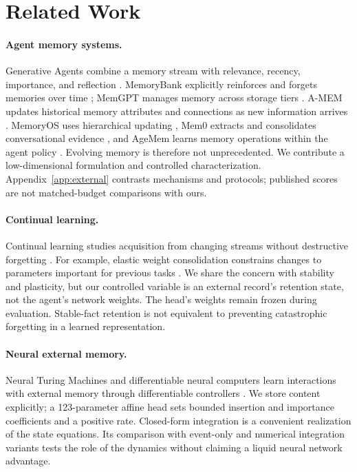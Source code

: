 \section{Related Work}
\paragraph{Agent memory systems.}
Generative Agents combine a memory stream with relevance, recency, importance, and reflection \citep{generative}. MemoryBank explicitly reinforces and forgets memories over time \citep{memorybank}; MemGPT manages memory across storage tiers \citep{memgpt}. A-MEM updates historical memory attributes and connections as new information arrives \citep{amem}. MemoryOS uses hierarchical updating \citep{memoryos}, Mem0 extracts and consolidates conversational evidence \citep{mem0}, and AgeMem learns memory operations within the agent policy \citep{agemem}. Evolving memory is therefore not unprecedented. We contribute a low-dimensional formulation and controlled characterization. Appendix~\ref{app:external} contrasts mechanisms and protocols; published scores are not matched-budget comparisons with ours.

\paragraph{Continual learning.}
Continual learning studies acquisition from changing streams without destructive forgetting \citep{continual}. For example, elastic weight consolidation constrains changes to parameters important for previous tasks \citep{ewc}. We share the concern with stability and plasticity, but our controlled variable is an external record's retention state, not the agent's network weights. The head's weights remain frozen during evaluation. Stable-fact retention is not equivalent to preventing catastrophic forgetting in a learned representation.

\paragraph{Neural external memory.}
Neural Turing Machines and differentiable neural computers learn interactions with external memory through differentiable controllers \citep{ntm,dnc}. We store content explicitly; a 123-parameter affine head sets bounded insertion and importance coefficients and a positive rate. Closed-form integration is a convenient realization of the state equations. Its comparison with event-only and numerical integration variants tests the role of the dynamics without claiming a liquid neural network advantage.

